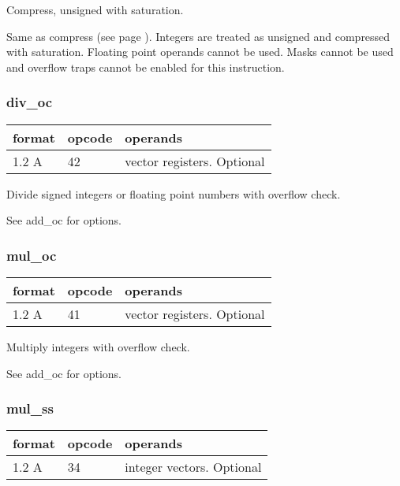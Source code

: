 \documentclass[forwardcom.tex]{subfiles}
\begin{document}
Compress, unsigned with saturation.
\vspace{2mm}

Same as compress (see page \pageref{table:compressInstruction}). Integers are treated as unsigned and compressed with saturation. Floating point operands cannot be used.
Masks cannot be used and overflow traps cannot be enabled for this instruction.
\vspace{2mm}


\subsubsection{div\_oc}
\label{table:divOcInstruction}
\begin{tabular}{|p{12mm}|p{12mm}|p{110mm}|}
\hline
\bfseries format & \bfseries opcode & \bfseries operands \\ \hline
1.2 A & 42 & vector registers. Optional \\ \hline
\end{tabular}
\vspace{2mm}

Divide signed integers or floating point numbers with overflow check.

See add\_oc for options.

\subsubsection{mul\_oc}
\label{table:mulOcInstruction}
\begin{tabular}{|p{12mm}|p{12mm}|p{110mm}|}
\hline
\bfseries format & \bfseries opcode & \bfseries operands \\ \hline
1.2 A & 41 & vector registers. Optional \\ \hline
\end{tabular}
\vspace{2mm}

Multiply integers with overflow check.

See add\_oc for options.

\subsubsection{mul\_ss}
\label{table:mulSsInstruction}
\begin{tabular}{|p{12mm}|p{12mm}|p{110mm}|}
\hline
\bfseries format & \bfseries opcode & \bfseries operands \\ \hline
1.2 A & 34 & integer vectors. Optional \\ \hline
\end{tabular}
\vspace{2mm}
\end{document}
